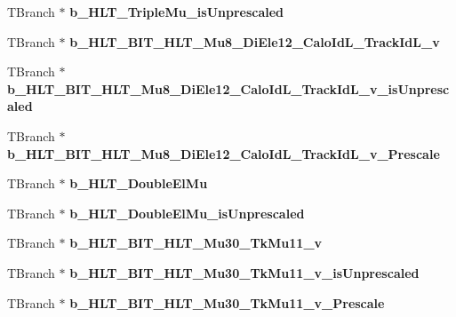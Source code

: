 \begin{DoxyCompactItemize}
T\+Branch $\ast$ {\bfseries b\+\_\+\+H\+L\+T\+\_\+\+Triple\+Mu\+\_\+is\+Unprescaled}
\item 
\hypertarget{classMiniTree_a7113e85466fcd7d13b3590f683829f05}{}\label{classMiniTree_a7113e85466fcd7d13b3590f683829f05} 
T\+Branch $\ast$ {\bfseries b\+\_\+\+H\+L\+T\+\_\+\+B\+I\+T\+\_\+\+H\+L\+T\+\_\+\+Mu8\+\_\+\+Di\+Ele12\+\_\+\+Calo\+Id\+L\+\_\+\+Track\+Id\+L\+\_\+v}
\item 
\hypertarget{classMiniTree_a533c0bdc674d5c50f9df0643946178f7}{}\label{classMiniTree_a533c0bdc674d5c50f9df0643946178f7} 
T\+Branch $\ast$ {\bfseries b\+\_\+\+H\+L\+T\+\_\+\+B\+I\+T\+\_\+\+H\+L\+T\+\_\+\+Mu8\+\_\+\+Di\+Ele12\+\_\+\+Calo\+Id\+L\+\_\+\+Track\+Id\+L\+\_\+v\+\_\+is\+Unprescaled}
\item 
\hypertarget{classMiniTree_acaff600a621c0dbac7fdaca21f44d716}{}\label{classMiniTree_acaff600a621c0dbac7fdaca21f44d716} 
T\+Branch $\ast$ {\bfseries b\+\_\+\+H\+L\+T\+\_\+\+B\+I\+T\+\_\+\+H\+L\+T\+\_\+\+Mu8\+\_\+\+Di\+Ele12\+\_\+\+Calo\+Id\+L\+\_\+\+Track\+Id\+L\+\_\+v\+\_\+\+Prescale}
\item 
\hypertarget{classMiniTree_ae189522e7a8507b5115d0747b9585391}{}\label{classMiniTree_ae189522e7a8507b5115d0747b9585391} 
T\+Branch $\ast$ {\bfseries b\+\_\+\+H\+L\+T\+\_\+\+Double\+El\+Mu}
\item 
\hypertarget{classMiniTree_a97834788942c368b25832d5db890b0d4}{}\label{classMiniTree_a97834788942c368b25832d5db890b0d4} 
T\+Branch $\ast$ {\bfseries b\+\_\+\+H\+L\+T\+\_\+\+Double\+El\+Mu\+\_\+is\+Unprescaled}
\item 
\hypertarget{classMiniTree_aaa04db9d7001797ffa95017afc53d904}{}\label{classMiniTree_aaa04db9d7001797ffa95017afc53d904} 
T\+Branch $\ast$ {\bfseries b\+\_\+\+H\+L\+T\+\_\+\+B\+I\+T\+\_\+\+H\+L\+T\+\_\+\+Mu30\+\_\+\+Tk\+Mu11\+\_\+v}
\item 
\hypertarget{classMiniTree_a60550a10de6ba2e9fe300eb3e2c7ad4d}{}\label{classMiniTree_a60550a10de6ba2e9fe300eb3e2c7ad4d} 
T\+Branch $\ast$ {\bfseries b\+\_\+\+H\+L\+T\+\_\+\+B\+I\+T\+\_\+\+H\+L\+T\+\_\+\+Mu30\+\_\+\+Tk\+Mu11\+\_\+v\+\_\+is\+Unprescaled}
\item 
\hypertarget{classMiniTree_ae31b3a137790bb6252c45f4ec622f3ff}{}\label{classMiniTree_ae31b3a137790bb6252c45f4ec622f3ff} 
T\+Branch $\ast$ {\bfseries b\+\_\+\+H\+L\+T\+\_\+\+B\+I\+T\+\_\+\+H\+L\+T\+\_\+\+Mu30\+\_\+\+Tk\+Mu11\+\_\+v\+\_\+\+Prescale}
\item 
\hypertarget{classMiniTree_a4d20a6122b520adc8240675ae72f9bec}{}\label{classMiniTree_a4d20a6122b520adc8240675ae72f9bec} 

\end{DoxyCompactItemize}
